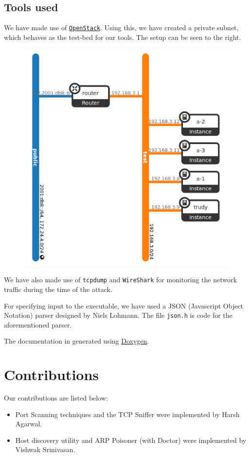 \documentclass[12pt]{article}
\newcommand{\pbreak}{\vspace{4mm}}
\begin{document}
\subsection{Tools used}
\begin{minipage}{0.48\linewidth}
We have made use of \href{https://www.openstack.org/}{\texttt{OpenStack}}. Using this, we have created a private subnet, which behaves as the test-bed for our tools. The setup can be seen to the right.
\end{minipage}
\hfill
\begin{minipage}{0.48\linewidth}
\begin{figure}[H]
\centering
\includegraphics[width=0.75\linewidth]{open-stack-setup.png}
\end{figure}
\end{minipage}
\pbreak

We have also made use of \texttt{tcpdump} and \texttt{WireShark} for monitoring the network traffic during the time of the attack.
\pbreak

For specifying input to the executable, we have used a JSON (Javascript Object Notation) parser designed by Niels Lohmann. The file \texttt{json.h} is code for the aforementioned parser.
\pbreak

The documentation in generated using \href{http://www.stack.nl/~dimitri/doxygen/}{Doxygen}.

\section{Contributions}
Our contributions are listed below:
\begin{itemize}
    \item Port Scanning techniques and the TCP Sniffer were implemented by Harsh Agarwal.
    \item Host discovery utility and ARP Poisoner (with Doctor) were implemented by Vishwak Srinivasan.
\end{itemize}
\end{document}
